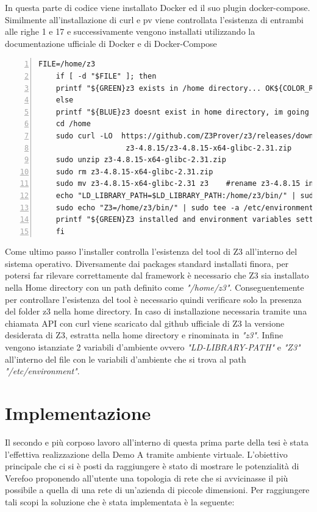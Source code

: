 In questa parte di codice viene installato Docker ed il suo plugin docker-compose. Similmente all'installazione di curl e pv 
viene controllata l'esistenza di entrambi alle righe 1 e 17 e successivamente vengono installati utilizzando la documentazione ufficiale di 
Docker\cite{dockerubuntu} e di Docker-Compose\cite{dockercomposelinux}

\begin{lstlisting}[style=bashstyle, caption={Installazione Z3}, label=lst:bash-example,numbers=left]
    FILE=/home/z3
    if [ -d "$FILE" ]; then
    printf "${GREEN}z3 exists in /home directory... OK${COLOR_RESET}\n"
    else
    printf "${BLUE}z3 doesnt exist in home directory, im going to install it\n${COLOR_RESET}\n"
    cd /home
    sudo curl -LO  https://github.com/Z3Prover/z3/releases/download/
                    z3-4.8.15/z3-4.8.15-x64-glibc-2.31.zip
    sudo unzip z3-4.8.15-x64-glibc-2.31.zip
    sudo rm z3-4.8.15-x64-glibc-2.31.zip 
    sudo mv z3-4.8.15-x64-glibc-2.31 z3    #rename z3-4.8.15 into z3 
    echo "LD_LIBRARY_PATH=$LD_LIBRARY_PATH:/home/z3/bin/" | sudo tee -a /etc/environment # Care!! >> not > or it will over write environment variables
    sudo echo "Z3=/home/z3/bin/" | sudo tee -a /etc/environment
    printf "${GREEN}Z3 installed and environment variables setted... OK${COLOR_RESET}\n"
    fi
\end{lstlisting}
Come ultimo passo l'installer controlla l'esistenza del tool di Z3 all'interno del sistema operativo. Diversamente dai packages standard installati finora, per potersi far rilevare correttamente dal framework
è necessario che Z3 sia installato nella Home directory con un path definito come \textit{"/home/z3"}. Conseguentemente per controllare l'esistenza del tool è necessario quindi verificare solo la presenza del folder z3 nella home directory.
In caso di installazione necessaria tramite una chiamata API con curl viene scaricato dal github ufficiale di Z3 \cite{z3prover} la versione desiderata di Z3, estratta nella home directory e rinominata in \textit{"z3"}.
Infine vengono istanziate 2 variabili d'ambiente ovvero \textit{"LD-LIBRARY-PATH"} e \textit{"Z3"} all'interno del file con le variabili d'ambiente che si trova al path \textit{"/etc/environment"}.

\section{Implementazione}
Il secondo e più corposo lavoro all'interno di questa prima parte della tesi è stata l'effettiva realizzazione della Demo A tramite ambiente virtuale. L'obiettivo principale che ci si è posti da raggiungere è stato di mostrare le potenzialità di Verefoo proponendo all'utente una topologia di rete 
che si avvicinasse il più possibile a quella di una rete di un'azienda di piccole dimensioni. Per raggiungere tali scopi la soluzione che è stata implementata è la seguente:

